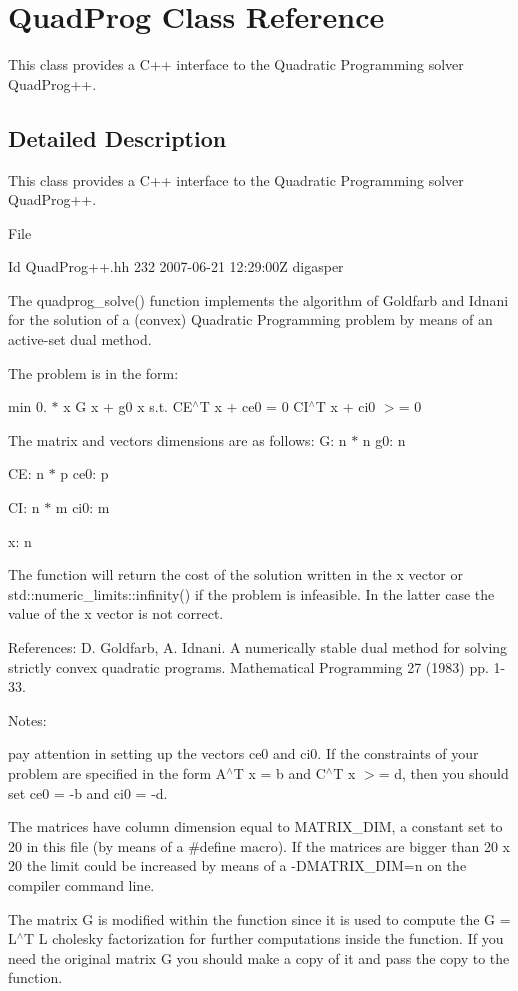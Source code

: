 \hypertarget{classQuadProg}{}\section{Quad\+Prog Class Reference}
\label{classQuadProg}


This class provides a C++ interface to the Quadratic Programming solver Quad\+Prog++.  




\subsection{Detailed Description}
This class provides a C++ interface to the Quadratic Programming solver Quad\+Prog++. 

File \begin{DoxyParagraph}{Id}
Quad\+Prog++.hh 232 2007-\/06-\/21 12\+:29\+:00Z digasper 
\end{DoxyParagraph}


The quadprog\+\_\+solve() function implements the algorithm of Goldfarb and Idnani for the solution of a (convex) Quadratic Programming problem by means of an active-\/set dual method.

The problem is in the form\+:

min 0. $\ast$ x G x + g0 x s.\+t. C\+E$^\wedge$T x + ce0 = 0 C\+I$^\wedge$T x + ci0 $>$= 0

The matrix and vectors dimensions are as follows\+: G\+: n $\ast$ n g0\+: n

CE\+: n $\ast$ p ce0\+: p

CI\+: n $\ast$ m ci0\+: m

x\+: n

The function will return the cost of the solution written in the x vector or std\+::numeric\+\_\+limits\+::infinity() if the problem is infeasible. In the latter case the value of the x vector is not correct.

References\+: D. Goldfarb, A. Idnani. A numerically stable dual method for solving strictly convex quadratic programs. Mathematical Programming 27 (1983) pp. 1-\/33.

Notes\+:
\begin{DoxyEnumerate}
\item pay attention in setting up the vectors ce0 and ci0. If the constraints of your problem are specified in the form A$^\wedge$T x = b and C$^\wedge$T x $>$= d, then you should set ce0 = -\/b and ci0 = -\/d.
\item The matrices have column dimension equal to M\+A\+T\+R\+I\+X\+\_\+\+D\+IM, a constant set to 20 in this file (by means of a \#define macro). If the matrices are bigger than 20 x 20 the limit could be increased by means of a -\/\+D\+M\+A\+T\+R\+I\+X\+\_\+\+D\+IM=n on the compiler command line.
\item The matrix G is modified within the function since it is used to compute the G = L$^\wedge$T L cholesky factorization for further computations inside the function. If you need the original matrix G you should make a copy of it and pass the copy to the function.
\end{DoxyEnumerate}

